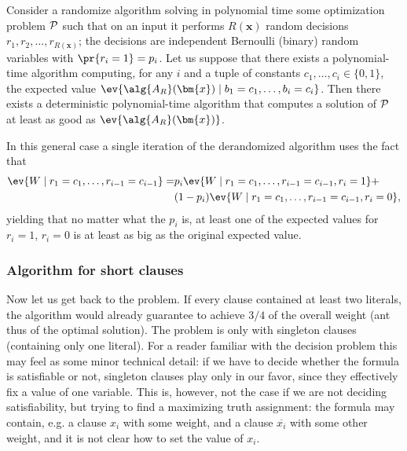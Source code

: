 \begin{veta}
\label{thm:derandom}
Consider a randomize algorithm  solving in polynomial time some optimization problem ${\cal P}$
such that on an input  it performs $R(\bm{x})$ random decisions $r_1,r_2,\ldots,r_{R(\bm{x})}$;
the decisions are independent Bernoulli (binary) random variables with  $\pr{r_i=1}=p_i$.  
Let us suppose that there exists a polynomial-time algorithm computing, for any $i$ and a tuple of constants
 $c_1,\ldots,c_i\in\{0,1\}$, the expected value  $\ev{\alg{A_R}(\bm{x})\mid b_1=c_1,\ldots,b_i=c_i}$.
Then there exists a deterministic polynomial-time algorithm that computes a solution of ${\cal P}$
at least as good as $\ev{\alg{A_R}(\bm{x})}$.
\end{veta}

\noindent
In this general case a single iteration of the derandomized algorithm uses the fact that
\begin{align*}
\ev{W\mid r_1=c_1,\ldots,r_{i-1}=c_{i-1}}=&
p_i\ev{W\mid r_1=c_1,\ldots,r_{i-1}=c_{i-1},r_i=1} +\\
&(1-p_i)\ev{W\mid r_1=c_1,\ldots,r_{i-1}=c_{i-1},r_i=0},
\end{align*}
yielding that no matter what the $p_i$ is, at least one of the expected values for
$r_i=1$, $r_i=0$ is at least as big as the original expected value.

\subsubsection*{Algorithm for short clauses}

\noindent
Now let us get back to the \maxsat problem. If every clause contained at least two literals, the algorithm 
 would already guarantee to achieve $3/4$ of the overall weight (ant thus of the optimal solution). 
The problem is only with singleton clauses (containing only one literal). For a reader familiar with the
decision problem \sat this may feel as some minor technical detail: if we have to decide whether the
formula is satisfiable or not, singleton clauses play only in our favor, since they effectively fix a value
of one variable. This is, however, not the case if we are not deciding satisfiability, but trying to find
a maximizing truth assignment: the formula may contain, e.g. a clause $x_i$ with some weight, and a 
clause $\overline{x_i}$ with some other weight, and it is not clear how to set the value of $x_i$.


